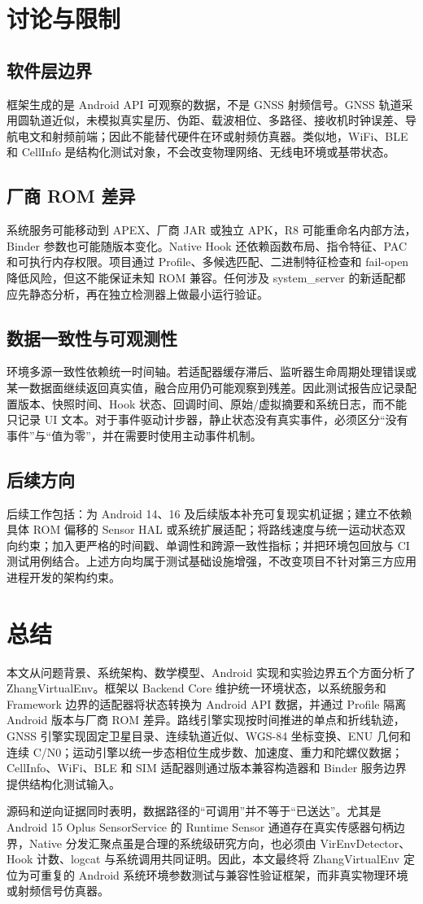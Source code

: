 \section{讨论与限制}
\subsection{软件层边界}
框架生成的是 Android API 可观察的数据，不是 GNSS 射频信号。GNSS 轨道采用圆轨道近似，未模拟真实星历、伪距、载波相位、多路径、接收机时钟误差、导航电文和射频前端；因此不能替代硬件在环或射频仿真器。类似地，WiFi、BLE 和 CellInfo 是结构化测试对象，不会改变物理网络、无线电环境或基带状态。

\subsection{厂商 ROM 差异}
系统服务可能移动到 APEX、厂商 JAR 或独立 APK，R8 可能重命名内部方法，Binder 参数也可能随版本变化。Native Hook 还依赖函数布局、指令特征、PAC 和可执行内存权限。项目通过 Profile、多候选匹配、二进制特征检查和 fail-open 降低风险，但这不能保证未知 ROM 兼容。任何涉及 system\_server 的新适配都应先静态分析，再在独立检测器上做最小运行验证。

\subsection{数据一致性与可观测性}
环境多源一致性依赖统一时间轴。若适配器缓存滞后、监听器生命周期处理错误或某一数据面继续返回真实值，融合应用仍可能观察到残差。因此测试报告应记录配置版本、快照时间、Hook 状态、回调时间、原始/虚拟摘要和系统日志，而不能只记录 UI 文本。对于事件驱动计步器，静止状态没有真实事件，必须区分“没有事件”与“值为零”，并在需要时使用主动事件机制。

\subsection{后续方向}
后续工作包括：为 Android 14、16 及后续版本补充可复现实机证据；建立不依赖具体 ROM 偏移的 Sensor HAL 或系统扩展适配；将路线速度与统一运动状态双向约束；加入更严格的时间戳、单调性和跨源一致性指标；并把环境包回放与 CI 测试用例结合。上述方向均属于测试基础设施增强，不改变项目不针对第三方应用进程开发的架构约束。

\section{总结}
本文从问题背景、系统架构、数学模型、Android 实现和实验边界五个方面分析了 ZhangVirtualEnv。框架以 Backend Core 维护统一环境状态，以系统服务和 Framework 边界的适配器将状态转换为 Android API 数据，并通过 Profile 隔离 Android 版本与厂商 ROM 差异。路线引擎实现按时间推进的单点和折线轨迹，GNSS 引擎实现固定卫星目录、连续轨道近似、WGS-84 坐标变换、ENU 几何和连续 C/N0；运动引擎以统一步态相位生成步数、加速度、重力和陀螺仪数据；CellInfo、WiFi、BLE 和 SIM 适配器则通过版本兼容构造器和 Binder 服务边界提供结构化测试输入。

源码和逆向证据同时表明，数据路径的“可调用”并不等于“已送达”。尤其是 Android 15 Oplus SensorService 的 Runtime Sensor 通道存在真实传感器句柄边界，Native 分发汇聚点虽是合理的系统级研究方向，也必须由 VirEnvDetector、Hook 计数、logcat 与系统调用共同证明。因此，本文最终将 ZhangVirtualEnv 定位为可重复的 Android 系统环境参数测试与兼容性验证框架，而非真实物理环境或射频信号仿真器。
